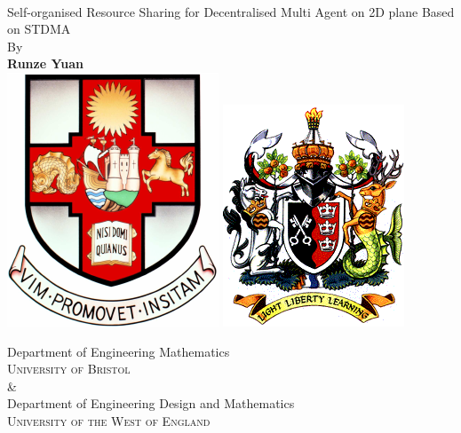 \documentclass[12pt, oneside]{article}
\begin{document}
\begin{titlepage}
    \begin{center}
        \vspace*{1cm}
        {\huges
        }
         \\
         \vspace{0.3cm}
         \large{Self-organised Resource Sharing for Decentralised Multi Agent on 2D plane Based on STDMA}
         \vspace{0.5cm}
        \\
        {\large By}
        \\
        \vspace{0.5cm}
        \textbf{Runze Yuan}
   		\vspace{1.5cm}
        \\
        \vspace{0.25cm}
       \includegraphics[scale=0.6]{logos/bristolcrest_colour.pdf}
        \hspace{5mm}
        \includegraphics[scale=0.35]{logos/UWE_insignia.png}

        \vspace{10mm}
        {\large Department of Engineering Mathematics\\
        \textsc{University of Bristol}}
        \\
        \&
        \\
        {\large Department of Engineering Design and Mathematics\\
        \textsc{University of the West of England}}\\


\end{center}
\end{titlepage}
\end{document}
